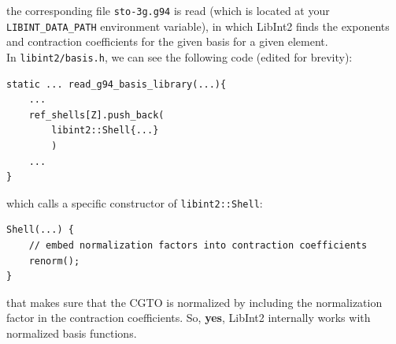 \documentclass[12pt]{article}
\begin{document}
    the corresponding file \lstinline{sto-3g.g94} is read (which is located at your \lstinline{LIBINT_DATA_PATH} environment variable), in which LibInt2 finds the exponents and contraction coefficients for the given basis for a given element. \\

    In \lstinline{libint2/basis.h}, we can see the following code (edited for brevity):

\begin{lstlisting}
static ... read_g94_basis_library(...){
    ...
    ref_shells[Z].push_back(
        libint2::Shell{...}
        )
    ...
}
\end{lstlisting}

    which calls a specific constructor of \lstinline{libint2::Shell}:

\begin{lstlisting}
Shell(...) {
    // embed normalization factors into contraction coefficients
    renorm();
}
\end{lstlisting}

    that makes sure that the CGTO is normalized by including the normalization factor in the contraction coefficients. So, \textbf{yes}, LibInt2 internally works with normalized basis functions.




\newpage


\end{document}
